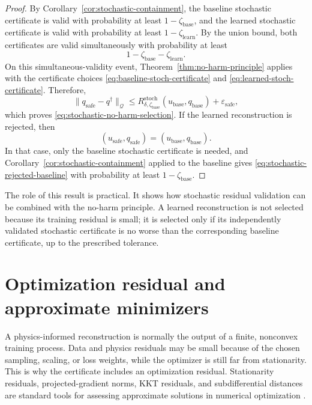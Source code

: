 \documentclass{article}
\numberwithin{equation}{section}
\theoremstyle{definition}
\begin{document}
\begin{proof}
By Corollary~\ref{cor:stochastic-containment}, the baseline stochastic certificate is valid with probability at least \(1-\zeta_{\mathrm{base}}\), and the learned stochastic certificate is valid with probability at least \(1-\zeta_{\mathrm{learn}}\). By the union bound, both certificates are valid simultaneously with probability at least
\[
1-\zeta_{\mathrm{base}}-\zeta_{\mathrm{learn}}.
\]
On this simultaneous-validity event, Theorem~\ref{thm:no-harm-principle} applies with the certificate choices \eqref{eq:baseline-stoch-certificate} and \eqref{eq:learned-stoch-certificate}. Therefore,
\[
\|q_{\mathrm{safe}}-q^\dagger\|_{\mathcal Q}
\le
R_{\delta,\zeta_{\mathrm{base}}}^{\mathrm{stoch}}(u_{\mathrm{base}},q_{\mathrm{base}})
+
\varepsilon_{\mathrm{safe}},
\]
which proves \eqref{eq:stochastic-no-harm-selection}. If the learned reconstruction is rejected, then
\[
(u_{\mathrm{safe}},q_{\mathrm{safe}})
=
(u_{\mathrm{base}},q_{\mathrm{base}}).
\]
In that case, only the baseline stochastic certificate is needed, and Corollary~\ref{cor:stochastic-containment} applied to the baseline gives \eqref{eq:stochastic-rejected-baseline} with probability at least \(1-\zeta_{\mathrm{base}}\).
\end{proof}

The role of this result is practical. It shows how stochastic residual validation can be combined with the no-harm principle. A learned reconstruction is not selected because its training residual is small; it is selected only if its independently validated stochastic certificate is no worse than the corresponding baseline certificate, up to the prescribed tolerance.


\section{Optimization residual and approximate minimizers}
\label{sec:optimization}

A physics-informed reconstruction is normally the output of a finite, nonconvex training process. Data and physics residuals may be small because of the chosen sampling, scaling, or loss weights, while the optimizer is still far from stationarity. This is why the certificate includes an optimization residual. Stationarity residuals, projected-gradient norms, KKT residuals, and subdifferential distances are standard tools for assessing approximate solutions in numerical optimization \cite{NocedalWright2006,Bertsekas1999,RockafellarWets1998}.
\end{document}
